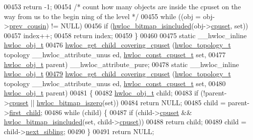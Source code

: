 \begin{DoxyCode}
00453     \textcolor{keywordflow}{return} -1;
00454   \textcolor{comment}{/* count how many objects are inside the cpuset on the way from us to the begin
      ning of the level */}
00455   \textcolor{keywordflow}{while} ((obj = obj->\hyperlink{a00016_ac715989f55ff5a0eb6be2969ee477ec0}{prev_cousin}) != NULL)
00456     \textcolor{keywordflow}{if} (\hyperlink{a00065_gaae29e14a926c198e8f91e6e4790621e7}{hwloc_bitmap_isincluded}(obj->\hyperlink{a00016_a67925e0f2c47f50408fbdb9bddd0790f}{cpuset}, \textcolor{keyword}{set}))
00457       index++;
00458   \textcolor{keywordflow}{return} index;
00459 \}
00460 
00475 \textcolor{keyword}{static} \_\_hwloc\_inline \hyperlink{a00016}{hwloc_obj_t}
00476 \hyperlink{a00055_ga69a22cc76c88115aee7b7e6fc53fca7d}{hwloc_get_child_covering_cpuset} (\hyperlink{a00039_ga9d1e76ee15a7dee158b786c30b6a6e38}{hwloc_topology_t} topology \_\_hwloc\_attribute\_unus
      ed, \hyperlink{a00040_ga1f784433e9b606261f62d1134f6a3b25}{hwloc_const_cpuset_t} \textcolor{keyword}{set},
00477                                 \hyperlink{a00016}{hwloc_obj_t} parent) \_\_hwloc\_attribute\_pure;
00478 \textcolor{keyword}{static} \_\_hwloc\_inline \hyperlink{a00016}{hwloc_obj_t}
\hypertarget{a00031_source_l00479}{}\hyperlink{a00055_ga69a22cc76c88115aee7b7e6fc53fca7d}{00479} \hyperlink{a00055_ga69a22cc76c88115aee7b7e6fc53fca7d}{hwloc_get_child_covering_cpuset} (\hyperlink{a00039_ga9d1e76ee15a7dee158b786c30b6a6e38}{hwloc_topology_t} topology \_\_hwloc\_attribute\_unus
      ed, \hyperlink{a00040_ga1f784433e9b606261f62d1134f6a3b25}{hwloc_const_cpuset_t} \textcolor{keyword}{set},
00480                                 \hyperlink{a00016}{hwloc_obj_t} parent)
00481 \{
00482   \hyperlink{a00016}{hwloc_obj_t} child;
00483   \textcolor{keywordflow}{if} (!parent->\hyperlink{a00016_a67925e0f2c47f50408fbdb9bddd0790f}{cpuset} || \hyperlink{a00065_gaa94fed35d2a598bc4a8657b6955b7bf5}{hwloc_bitmap_iszero}(\textcolor{keyword}{set}))
00484     \textcolor{keywordflow}{return} NULL;
00485   child = parent->\hyperlink{a00016_af51d08a0a79dba517c06c5afedc8d2dc}{first_child};
00486   \textcolor{keywordflow}{while} (child) \{
00487     \textcolor{keywordflow}{if} (child->\hyperlink{a00016_a67925e0f2c47f50408fbdb9bddd0790f}{cpuset} && \hyperlink{a00065_gaae29e14a926c198e8f91e6e4790621e7}{hwloc_bitmap_isincluded}(\textcolor{keyword}{set}, child->\hyperlink{a00016_a67925e0f2c47f50408fbdb9bddd0790f}{cpuset}))
00488       \textcolor{keywordflow}{return} child;
00489     child = child->\hyperlink{a00016_a7f2343ed476fe4942e6fffd4cade1b40}{next_sibling};
00490   \}
00491   \textcolor{keywordflow}{return} NULL;

\end{DoxyCode}
